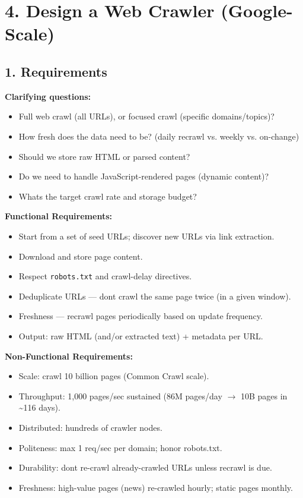 \documentclass[11pt]{article}
\providecommand{\tightlist}{\setlength{\itemsep}{1pt}\setlength{\parskip}{0pt}}
\begin{document}
\section{4. Design a Web Crawler (Google-Scale)}\label{4-design-a-web-crawler-google-scale}

\subsection{1. Requirements}\label{1-requirements-3}

\textbf{Clarifying questions:}

\begin{itemize}
\tightlist
\item
  Full web crawl (all URLs), or focused crawl (specific domains/topics)?
\item
  How fresh does the data need to be? (daily recrawl vs. weekly vs. on-change)
\item
  Should we store raw HTML or parsed content?
\item
  Do we need to handle JavaScript-rendered pages (dynamic content)?
\item
  What\textquotesingle s the target crawl rate and storage budget?
\end{itemize}

\textbf{Functional Requirements:}

\begin{itemize}
\tightlist
\item
  Start from a set of seed URLs; discover new URLs via link extraction.
\item
  Download and store page content.
\item
  Respect \texttt{robots.txt} and crawl-delay directives.
\item
  Deduplicate URLs --- don\textquotesingle t crawl the same page twice (in a given window).
\item
  Freshness --- recrawl pages periodically based on update frequency.
\item
  Output: raw HTML (and/or extracted text) + metadata per URL.
\end{itemize}

\textbf{Non-Functional Requirements:}

\begin{itemize}
\tightlist
\item
  Scale: crawl 10 billion pages (Common Crawl scale).
\item
  Throughput: 1,000 pages/sec sustained (86M pages/day \(\rightarrow\) 10B pages in \textasciitilde116 days).
\item
  Distributed: hundreds of crawler nodes.
\item
  Politeness: max 1 req/sec per domain; honor robots.txt.
\item
  Durability: don\textquotesingle t re-crawl already-crawled URLs unless recrawl is due.
\item
  Freshness: high-value pages (news) re-crawled hourly; static pages monthly.
\end{itemize}
\end{document}
